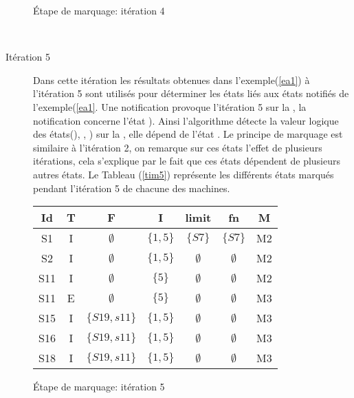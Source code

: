 \begin{Exemple}
\begin{description}
\begin{tableth}
\begin{tabular}{|*{7}{c|}}
	\end{tabular}
	\caption{Étape de marquage: itération 4}\label{tim4}
\end{tableth}\\

	\item[Itération 5] Dans cette itération les résultats obtenues dans l'exemple(\ref{ea1}) à l'itération 5 sont utilisés pour déterminer les états liés aux états notifiés de l'exemple(\ref{ea1}. Une notification provoque l'itération 5 sur la \mtree{}, la notification concerne l'état ). Ainsi l'algorithme détecte la valeur logique des états(), , ) sur la \mtree{}, elle dépend de l'état . Le principe de marquage est similaire à l'itération 2, on remarque sur ces états l'effet de plusieurs itérations, cela s'explique par le fait que ces états dépendent de plusieurs autres états. Le Tableau (\ref{tim5}) représente les différents états marqués pendant l'itération 5 de chacune des machines.
	\begin{tableth}
	\centering
	\begin{tabular}{|*{7}{c|}}
		\hline
		Id&		T&			F&	I&	limit&	fn&		M\\
		\hline
		S1&		I&$\emptyset$&		$\{1 ,5\}$&	$\{S7\}$&	$\{S7\}$&		M2\\ \hline
		S2&		I&$\emptyset$&		$\{1 ,5\}$&$\emptyset$&$\emptyset$&		M2\\ \hline
		S11&	I&$\emptyset$&		$\{5\}$	&$\emptyset$&$\emptyset$&		M2\\ \hline
		S11& 	E&$\emptyset$&		$\{5\}$&$\emptyset$&$\emptyset$&		M3\\ \hline
		S15&	I&	$\{S19,s11\}$&	$\{1 ,5\}$&$\emptyset$&$\emptyset$&		M3\\ \hline
		S16&	I&	$\{S19,s11\}$&	$\{1 ,5\}$&$\emptyset$&$\emptyset$&		M3\\ \hline
		S18&	I&	$\{S19,s11\}$&	$\{1 ,5\}$&$\emptyset$&$\emptyset$&		M3\\ \hline
	\end{tabular}
	\caption{Étape de marquage: itération 5}\label{tim5}
\end{tableth}\\

\end{description}	
\end{Exemple}